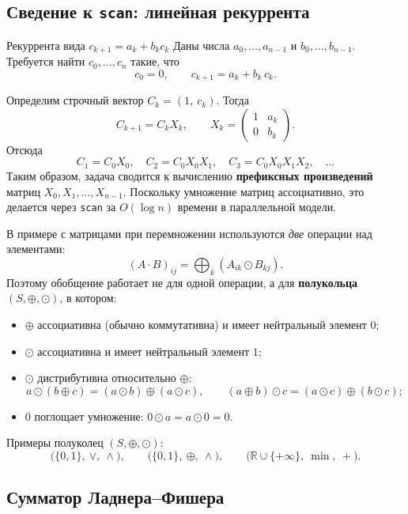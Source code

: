 \subsection{Сведение к \texttt{scan}: линейная рекуррента}

\begin{Example}{Рекуррента вида $c_{k+1} = a_k + b_k c_k$}{}
	Даны числа $a_0, \dots, a_{n-1}$ и $b_0, \dots, b_{n-1}$. Требуется найти $c_0, \dots, c_n$ такие, что
	\[
	c_0 = 0, \qquad c_{k+1} = a_k + b_k\, c_k.
	\]
	
	Определим строчный вектор $C_k = (1,\ c_k)$. Тогда
	\[
	C_{k+1} = C_k X_k, \qquad
	X_k = \begin{pmatrix} 1 & a_k \\ 0 & b_k \end{pmatrix}.
	\]
	Отсюда
	\[
	C_1 = C_0 X_0, \quad
	C_2 = C_0 X_0 X_1, \quad
	C_3 = C_0 X_0 X_1 X_2, \quad \dots
	\]
	Таким образом, задача сводится к вычислению \textbf{префиксных произведений} матриц $X_0, X_1, \dots, X_{n-1}$. Поскольку умножение матриц ассоциативно, это делается через \texttt{scan} за $O(\log n)$ времени в параллельной модели.
\end{Example}

\begin{Remark}{}{}
	В примере с матрицами при перемножении используются \emph{две} операции над элементами:
	\[
	(A \cdot B)_{ij} = \bigoplus_k (A_{ik} \odot B_{kj}).
	\]
	Поэтому обобщение работает не для одной операции, а для \textbf{полукольца} $(S, \oplus, \odot)$, в котором:
	\begin{itemize}
		\item $\oplus$ ассоциативна (обычно коммутативна) и имеет нейтральный элемент $0$;
		\item $\odot$ ассоциативна и имеет нейтральный элемент $1$;
		\item $\odot$ дистрибутивна относительно $\oplus$:
		\[
		a \odot (b \oplus c) = (a \odot b) \oplus (a \odot c), \qquad
		(a \oplus b) \odot c = (a \odot c) \oplus (b \odot c);
		\]
		\item $0$ поглощает умножение: $0 \odot a = a \odot 0 = 0$.
	\end{itemize}
	Примеры полуколец $(S, \oplus, \odot)$:
	\[
	\bigl(\{0,1\},\ \vee,\ \wedge\bigr), \qquad
	\bigl(\{0,1\},\ \oplus,\ \wedge\bigr), \qquad
	\bigl(\mathbb{R} \cup \{+\infty\},\ \min,\ +\bigr).
	\]
\end{Remark}

\subsection{Сумматор Ладнера–Фишера}

